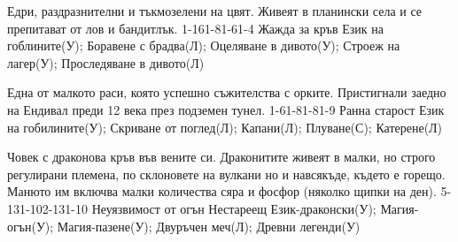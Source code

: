 \begin{multicols}{2}
{Едри, раздразнителни и тъкмозелени на цвят.
Живеят в планински села и се препитават от лов и бандитлък.}
{1-16}{1-8}{1-6}{1-4}
{
Жажда за кръв %
}
{
Език на гоблините(У);
Боравене с брадва(Л);
Оцеляване в дивото(У);
Строеж на лагер(У);
Проследяване в дивото(Л)
}

{Една от малкото раси, която успешно съжителства с орките.
Пристигнали заедно на Ендивал преди 12 века през подземен тунел.}
{1-6}{1-8}{1-8}{1-9}
{
Ранна старост
}
{
Език на гобилините(У);
Скриване от поглед(Л);
Капани(Л);
Плуване(С);
Катерене(Л)
}

{Човек с драконова кръв във вените си.
Драконитите живеят в малки, но строго регулирани племена, по склоновете на вулкани но и навсякъде, където е горещо.
Манюто им включва малки количества сяра и фосфор (няколко щипки на ден).}
{5-13}{1-10}{2-13}{1-10}
{
Неуязвимост от огън
Нестареещ
}
{
Език-драконски(У);
Магия-огън(У);
Магия-пазене(У);
Двуръчен меч(Л);
Древни легенди(У)
}

\end{multicols}
